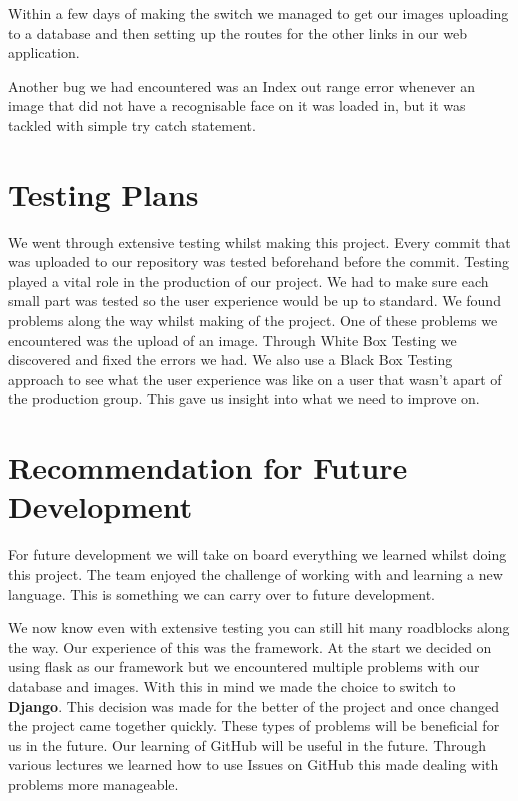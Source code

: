 \documentclass{article}
\begin{document}
\begin{flushleft}
\begin{flushleft}
Within a few days of making the switch we managed to get our images uploading to a database and then setting up the routes for the other links in our web application.

Another bug we had encountered was an Index out range error whenever an image that did not have a recognisable face on it was loaded in, but it was tackled with simple try catch statement.

\section{Testing Plans}
We went through extensive testing whilst making this project. Every commit that was uploaded to our repository was tested beforehand before the commit.
Testing played a vital role in the production of our project. We had to make sure each small part was tested so the user experience would be up to standard. We found problems along the way whilst making of the project. One of these problems we encountered was the upload of an image. Through White Box Testing we discovered and fixed the errors we had. We also use a Black Box Testing approach to see what the user experience was like on a user that wasn't apart of the production group. This gave us insight into what we need to improve on.  

\section{Recommendation for Future Development}
For future development we will take on board everything we learned whilst doing this project. The team enjoyed the challenge of working with and learning a new language. This is something we can carry over to future development.

We now know even with extensive testing you can still hit many roadblocks along the way. Our experience of this was the framework. At the start we decided on using flask as our framework but we encountered multiple problems with our database and images. With this in mind we made the choice to switch to \textbf{Django}. This decision was made for the better of the project and once changed the project came together quickly. These types of problems will be beneficial for us in the future. Our learning of GitHub will be useful in the future. Through various lectures we learned how to use Issues on GitHub this made dealing with problems more manageable.



\end{flushleft}
\end{flushleft}
\end{document}
